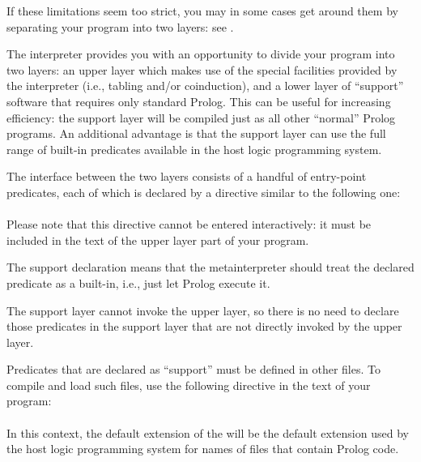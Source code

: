 If these limitations seem too strict, you may in some cases get around them
by separating your program into two layers: see .



The interpreter provides you with an opportunity to divide your program into
two layers: an upper layer which makes use of the special facilities provided
by the interpreter (i.e., tabling and/or coinduction), and a lower layer of
``support'' software that requires only standard Prolog.  This can be useful
for increasing efficiency: the support layer will be compiled just as all
other ``normal'' Prolog programs.  An additional advantage is that the
support layer can use the full range of built-in predicates available in the
host logic programming system.

The interface between the two layers consists of a handful of entry-point
predicates, each of which is  declared by a directive similar to the
following one:\\
\ind{}%
\label{dir:support}\\
Please note that this directive cannot be entered interactively: it must be
included in the text of the upper layer part of your program.

The support declaration means that the metainterpreter should treat the
declared predicate as a built-in, i.e., just let Prolog execute it.

The support layer cannot invoke the upper layer, so there is no need to
declare those predicates in the support layer that are not directly invoked
by the upper layer.

Predicates that are declared as ``support'' must be defined in other files.
To compile and load such files, use the following directive in the text of
your program:\\ \ind{}%
\label{dir:load-support}\\
In this context, the default extension of the  will be the
default extension used by the host logic programming system for names
of files that contain Prolog code.%
%





